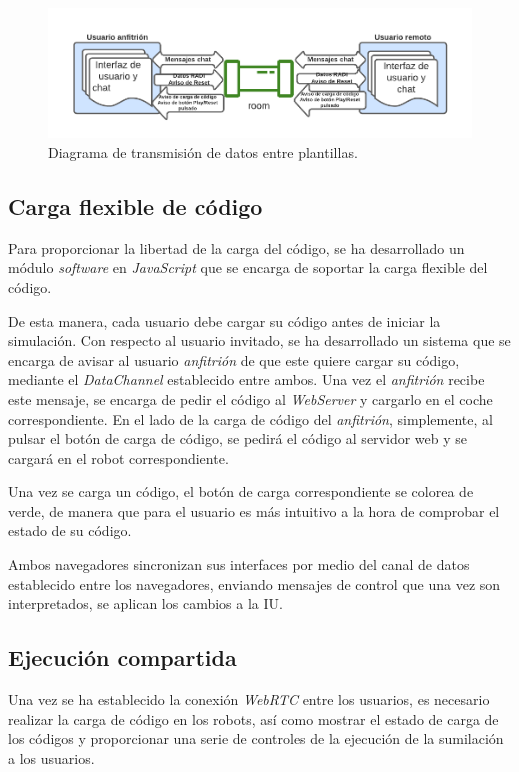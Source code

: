 \documentclass[a4paper, 12pt]{book}
\begin{document}
\begin{figure}[H]
	\centering
    \includegraphics[width=15cm]{img/transmision_datos.png}
    \caption{Diagrama de transmisión de datos entre plantillas.}
    \label{figura:diagrama_conexion_webrtc}
\end{figure}

\subsection{Carga flexible de código}

Para proporcionar la libertad de la carga del código, se ha desarrollado un módulo \emph{software} en \emph{JavaScript} que se encarga de soportar la carga flexible del código.

De esta manera, cada usuario debe cargar su código antes de iniciar la simulación. Con respecto al usuario invitado, se ha desarrollado un sistema que se encarga de avisar al usuario \emph{anfitrión} de que este quiere cargar su código, mediante el \emph{DataChannel} establecido entre ambos. Una vez el \emph{anfitrión} recibe este mensaje, se encarga de pedir el código al \emph{WebServer} y cargarlo en el coche correspondiente. En el lado de la carga de código del \emph{anfitrión}, simplemente, al pulsar el botón de carga de código, se pedirá el código al servidor web y se cargará en el robot correspondiente.

Una vez se carga un código, el botón de carga correspondiente se colorea de verde, de manera que para el usuario es más intuitivo a la hora de comprobar el estado de su código.

Ambos navegadores sincronizan sus interfaces por medio del canal de datos establecido entre los navegadores, enviando mensajes de control que una vez son interpretados, se aplican los cambios a la IU.

\subsection{Ejecución compartida}

Una vez se ha establecido la conexión \emph{WebRTC} entre los usuarios, es necesario realizar la carga de código en los robots, así como mostrar el estado de carga de los códigos y proporcionar una serie de controles de la ejecución de la sumilación a los usuarios.
\end{document}
